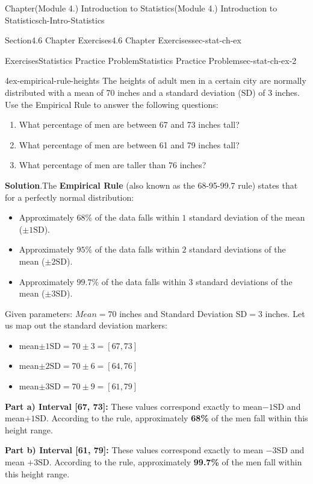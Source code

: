\documentclass[oneside,10pt,]{book}
\newcommand{\blocktitlefont}{\relax}
\newcommand{\ptxlistdisc}{\raisebox{0.3ex}{\textbullet}}
\newcommand{\terminology}[1]{\textbf{#1}}
\begin{document}
\begin{chapterptx}{Chapter}{(Module 4.) Introduction to Statistics}{}{(Module 4.) Introduction to Statistics}{}{}{ch-Intro-Statistics}
\begin{sectionptx}{Section}{4.6 Chapter Exercises}{}{4.6 Chapter Exercises}{}{}{sec-stat-ch-ex}
\begin{exercises-subsection-numberless}{Exercises}{Statistics Practice Problem}{}{Statistics Practice Problem}{}{}{sec-stat-ch-ex-2}
\begin{divisionexercise}{4}{}{}{ex-empirical-rule-heights}
The heights of adult men in a certain city are normally distributed with a mean of 70 inches and a standard deviation (\(\text{SD}\)) of 3 inches. Use the Empirical Rule to answer the following questions:%
\begin{enumerate}[label={\alph*)}]
\item{}What percentage of men are between 67 and 73 inches tall?%
\item{}What percentage of men are between 61 and 79 inches tall?%
\item{}What percentage of men are taller than 76 inches?%
\end{enumerate}
%
\par\smallskip%
\noindent\textbf{\blocktitlefont Solution}.\hypertarget{ex-empirical-rule-heights-2}{}\quad{}The \terminology{Empirical Rule} (also known as the 68-95-99.7 rule) states that for a perfectly normal distribution:%
\begin{itemize}[label=\ptxlistdisc]
\item{}Approximately \(68\%\) of the data falls within \(1\) standard deviation of the mean (\(\pm 1\text{SD}\)).%
\item{}Approximately \(95\%\) of the data falls within \(2\) standard deviations of the mean (\(\pm 2\text{SD}\)).%
\item{}Approximately \(99.7\%\) of the data falls within \(3\) standard deviations of the mean (\(\pm 3\text{SD}\)).%
\end{itemize}
%
\par
Given parameters: \(Mean = 70\) inches and Standard Deviation \(\text{SD} = 3\) inches. Let us map out the standard deviation markers:%
\begin{itemize}[label=\ptxlistdisc]
\item{}mean\(\pm 1\text{SD} = 70 \pm 3 = [67, 73]\)%
\item{}mean\(\pm 2\text{SD} = 70 \pm 6 = [64, 76]\)%
\item{}mean\(\pm 3\text{SD} = 70 \pm 9 = [61, 79]\)%
\end{itemize}
%
\par
\terminology{Part a) Interval [67, 73]:} These values correspond exactly to mean\(- 1\text{SD}\) and mean\(+ 1\text{SD}\). According to the rule, approximately \terminology{68\%} of the men fall within this height range.%
\par
\terminology{Part b) Interval [61, 79]:} These values correspond exactly to mean \(- 3\text{SD}\) and mean \(+ 3\text{SD}\). According to the rule, approximately \terminology{99.7\%} of the men fall within this height range.%

\end{divisionexercise}
\end{exercises-subsection-numberless}
\end{sectionptx}
\end{chapterptx}
\end{document}

